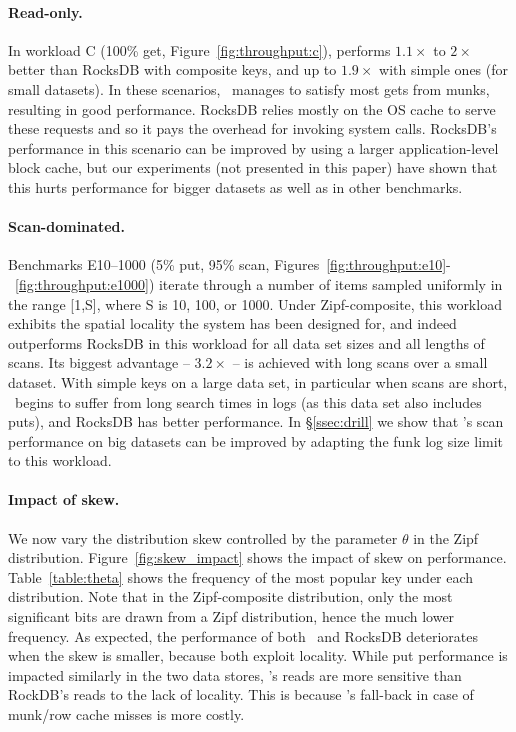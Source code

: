 \paragraph{Read-only.} 
In workload C (100\% get, Figure~\ref{fig:throughput:c}), 
\sys\/ performs $1.1\times$ to $2\times$ better than RocksDB with composite keys, and up to $1.9\times$  with simple ones (for small datasets). 
In these scenarios, \sys\  manages to satisfy most gets from munks, resulting in good performance.
RocksDB relies mostly on the OS cache to serve these requests and so it pays the overhead for invoking system calls. 
RocksDB's performance in this scenario can be improved by using a larger application-level block cache,
but our experiments (not presented in this paper) have shown that this hurts performance for bigger datasets as well as in other benchmarks.

\paragraph{Scan-dominated.} Benchmarks E10--1000  (5\% put, 95\% scan, Figures~\ref{fig:throughput:e10}-~\ref{fig:throughput:e1000})
iterate through a number of items sampled uniformly in the range [1,S], where S is  10, 100, or 1000. 
Under Zipf-composite, this workload exhibits the spatial locality the system has been designed for, and indeed 
\sys\/ outperforms RocksDB in this workload for all data set sizes and all lengths of scans.  Its biggest 
advantage -- $3.2\times$ -- is achieved with long scans over a small dataset. 
With simple keys on a large data set, in particular when scans are short, \sys\ begins to suffer from long search times in logs
(as this data set also includes puts), and RocksDB has better performance.
In \S\ref{ssec:drill} we show that \sys's scan performance on big datasets can be improved by adapting the funk log size limit to this workload. 
 
 \paragraph{Impact of skew.}
 
 We now vary the distribution skew controlled by the parameter $\theta$ in the Zipf distribution. 
Figure~\ref{fig:skew_impact} shows the impact of skew on performance. 
Table~\ref{table:theta} shows the frequency of the most popular key under each distribution. Note that in the Zipf-composite distribution, 
only the most significant bits are drawn from a Zipf distribution, hence the much lower frequency.
As expected, the performance of both \sys\ and RocksDB deteriorates when the skew is smaller,  because
both exploit locality. While put performance is impacted similarly in the two data stores, \sys's reads are
 more sensitive than RockDB's reads to the lack of locality. This is because \sys's fall-back in case of 
 munk/row cache misses is more costly. 

